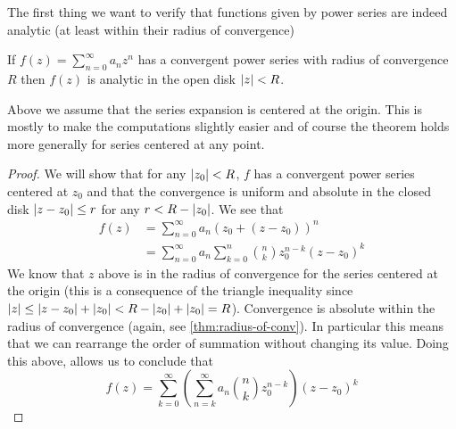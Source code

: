 The first thing we want to verify that functions given by power series are indeed analytic (at least within their radius of convergence)
\begin{proposition}
If $f(z) = \sum_{n = 0}^\infty a_n z^n$ has a convergent power series with radius of convergence $R$ then $f(z)$ is analytic in the open disk $\left|z\right| < R$.
\end{proposition}
\begin{remark}
Above we assume that the series expansion is centered at the origin. This is mostly to make the computations slightly easier and of course the theorem holds more generally for series centered at any point.
\end{remark}
\begin{proof}
We will show that for any $\left|z_0\right| < R$, $f$ has a convergent power series centered at $z_0$ and that the convergence is uniform and absolute in the closed disk $\left|z - z_0\right| \leq r$ for any $r < R - \left|z_0\right|$. We see that
\begin{align*}
    f(z) &= \sum_{n = 0}^\infty a_n (z_0 + (z - z_0))^n\\
    &= \sum_{n = 0}^\infty a_n \sum_{k = 0}^n \binom{n}{k} z_0^{n - k} (z - z_0)^k 
\end{align*}
We know that $z$ above is in the radius of convergence for the series centered at the origin (this is a consequence of the triangle inequality since $\left|z\right| \leq \left|z - z_0\right| + \left|z_0\right| < R - \left|z_0\right| + \left|z_0\right| = R$). Convergence is absolute within the radius of convergence (again, see \autoref{thm:radius-of-conv}). In particular this means that we can rearrange the order of summation without changing its value. Doing this above, allows us to conclude that
$$ f(z) = \sum_{k = 0}^\infty \left( \sum_{n = k}^\infty a_n \binom{n}{k} z_0^{n - k} \right) (z - z_0)^k $$
\end{proof}

